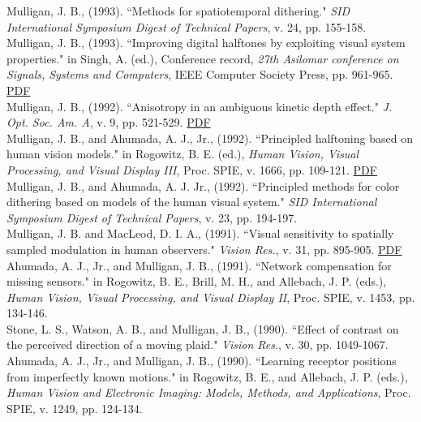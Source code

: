 \documentclass[12pt]{article}
\newcommand{\years}[1]{\marginnote{\scriptsize #1}}
\begin{document}
Mulligan, J. B., (1993).
``Methods for spatiotemporal dithering."
\emph{SID International Symposium Digest of Technical Papers},
v. 24, pp. 155-158.\\

Mulligan, J. B., (1993).
``Improving digital halftones by exploiting visual system properties."
in Singh, A. (ed.), Conference record,
\emph{27th Asilomar conference on Signals, Systems and Computers},
IEEE Computer Society Press,
pp. 961-965.  \href{https://hsi.arc.nasa.gov/publications/mulligan_asil93.pdf}{PDF}\\

\years{1992}
Mulligan, J. B., (1992).
``Anisotropy in an ambiguous kinetic depth effect."
\emph{J. Opt. Soc. Am. A},
v. 9, pp. 521-529.  \href{https://hsi.arc.nasa.gov/publications/Mulligan_anis.pdf}{PDF}\\

Mulligan, J. B., and Ahumada, A. J., Jr., (1992).
``Principled halftoning based on human vision models."
in Rogowitz, B. E. (ed.),
\emph{Human Vision, Visual Processing, and Visual Display III},
Proc. SPIE, v. 1666,
pp. 109-121.  \href{https://hsi.arc.nasa.gov/publications/mulligan_spie92.pdf}{PDF}\\

Mulligan, J. B., and Ahumada, A. J. Jr., (1992).
``Principled methods for color dithering based on models of the human visual system."
\emph{SID International Symposium Digest of Technical Papers},
v. 23, pp. 194-197.\\

\years{1991}
Mulligan, J. B. and MacLeod, D. I. A., (1991).
``Visual sensitivity to spatially sampled modulation in human observers."
\emph{Vision Res.}, v. 31, pp. 895-905.  \href{https://hsi.arc.nasa.gov/publications/Mulligan_samp300.pdf}{PDF}\\

Ahumada, A. J., Jr., and Mulligan, J. B., (1991).
``Network compensation for missing sensors."
in Rogowitz, B. E., Brill, M. H., and Allebach, J. P. (eds.),
\emph{Human Vision, Visual Processing, and Visual Display II},
Proc. SPIE, v. 1453,
pp. 134-146.\\

\years{1990}
Stone, L. S., Watson, A. B., and Mulligan, J. B., (1990).
``Effect of contrast on the perceived direction of a moving plaid."
\emph{Vision Res}., v. 30, pp. 1049-1067.\\

Ahumada, A. J., Jr., and Mulligan, J. B., (1990).
``Learning receptor positions from imperfectly known motions."
in Rogowitz, B. E., and Allebach, J. P. (eds.),
\emph{Human Vision and Electronic Imaging:  Models, Methods, and Applications},
Proc. SPIE, v. 1249,
pp. 124-134.\\
\end{document}
